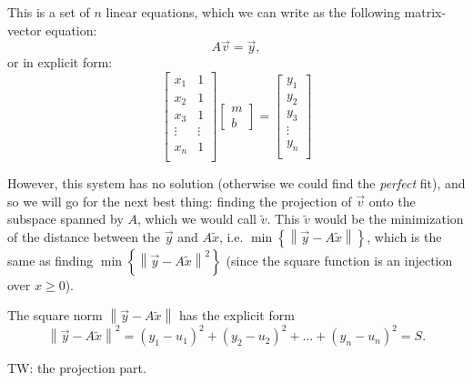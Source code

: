 \documentclass{article}
\begin{document}
This is a set of $n$ linear equations, which we can write as the following matrix-vector equation:
\begin{equation}
	A\vec{v} = \vec{y},
	\label{eq:}
\end{equation}
or in explicit form:
\begin{equation}
	\begin{bmatrix}
		x_{1}  & 1      \\
		x_{2}  & 1      \\
		x_{3}  & 1      \\
		\vdots & \vdots \\
		x_{n}  & 1      \\
	\end{bmatrix}
	\begin{bmatrix}
		m \\ b
	\end{bmatrix}
	=
	\begin{bmatrix}
		y_{1}  \\
		y_{2}  \\
		y_{3}  \\
		\vdots \\
		y_{n}  \\
	\end{bmatrix}
	\label{eq:matrix_form}
\end{equation}

However, this system has no solution (otherwise we could find the \textit{perfect} fit), and so we will go for the next best thing: finding the projection of $\vec{v}$ onto the subspace spanned by $A$, which we would call $\tilde{v}$. This $\tilde{v}$ would be the minimization of the distance between the $\vec{y}$ and $A\tilde{x}$, i.e. $\min\left\{\left\|\vec{y}-A\tilde{x}\right\|\right\}$, which is the same as finding $\min\left\{\left\|\vec{y}-A\tilde{x}\right\|^{2}\right\}$ (since the square function is an injection over $x\geq0$).

The square norm $\left\|\vec{y}-A\tilde{x}\right\|$ has the explicit form
\begin{equation}
	\left\|\vec{y}-A\tilde{x}\right\|^{2} = \left(y_{1}-u_{1}\right)^{2} + \left(y_{2}-u_{2}\right)^{2} + \dots + \left(y_{n}-u_{n}\right)^{2} = S.
	\label{eq:minimization_as_vector_norm}
\end{equation}

TW: the projection part.
\end{document}
